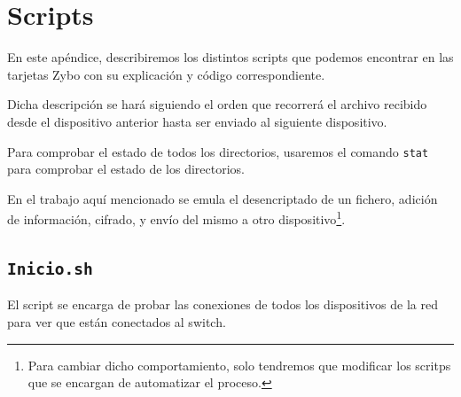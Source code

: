 \chapter{Scripts}
\hypertarget{Scripts}{}
En este apéndice, describiremos los distintos scripts que podemos encontrar en las tarjetas Zybo con su explicación y código correspondiente.

Dicha descripción se hará siguiendo el orden que recorrerá el archivo recibido desde el dispositivo anterior hasta ser enviado al siguiente dispositivo.

Para comprobar el estado de todos los directorios, usaremos el comando \texttt{stat} para comprobar el estado de los directorios.

En el trabajo aquí mencionado se emula el desencriptado de un fichero, adición de información, cifrado, y envío del mismo a otro dispositivo\footnote{Para cambiar dicho comportamiento, solo tendremos que modificar los scritps que se encargan de automatizar el proceso.}. %

\newpage
\section{\texttt{Inicio.sh}}
\hypertarget{ScriptConexion}{}
El script se encarga de probar las conexiones de todos los dispositivos de la red para ver que están conectados al switch.

